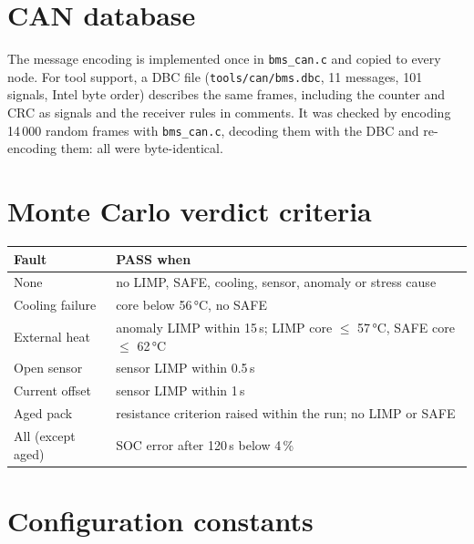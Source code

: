 \chapter{CAN database}\label{app:dbc}
The message encoding is implemented once in \texttt{bms\_can.c} and copied to every node. For tool support, a DBC file (\texttt{tools/can/bms.dbc}, 11 messages, 101 signals, Intel byte order) describes the same frames, including the counter and CRC as signals and the receiver rules in comments. It was checked by encoding 14\,000 random frames with \texttt{bms\_can.c}, decoding them with the DBC and re-encoding them: all were byte-identical. 


\chapter{Monte Carlo verdict criteria}\label{app:mc}
\begin{tabular}{@{}ll@{}}\toprule
Fault & PASS when \\\midrule
None & no LIMP, SAFE, cooling, sensor, anomaly or stress cause \\
Cooling failure & core below 56\,°C, no SAFE \\
External heat & anomaly LIMP within 15\,s; LIMP core $\le$ 57\,°C, SAFE core $\le$ 62\,°C \\
Open sensor & sensor LIMP within 0.5\,s \\
Current offset & sensor LIMP within 1\,s \\
Aged pack & resistance criterion raised within the run; no LIMP or SAFE \\
All (except aged) & SOC error after 120\,s below 4\,\% \\\bottomrule
\end{tabular}

\chapter{Configuration constants}\label{app:config}
